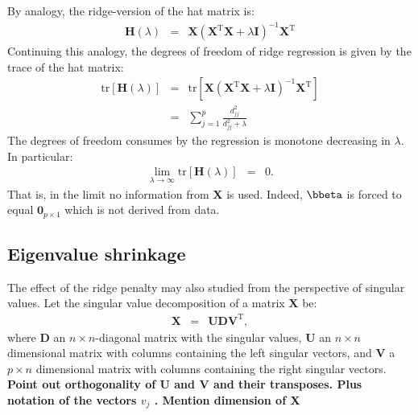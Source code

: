 \documentclass[a4paper]{article}
\theoremstyle{myexamplestyle}
\def\reminder#1{\marginpar{\rule[0pt]{1mm}{11pt}}\textbf{#1}}
\begin{document}
By analogy, the ridge-version of the hat matrix is:
\begin{eqnarray*}
\mathbf{H}(\lambda) & = & \mathbf{X} (\mathbf{X}^{\mathrm{T}} \mathbf{X} + \lambda \mathbf{I})^{-1} \mathbf{X}^{\mathrm{T}}
\end{eqnarray*}
Continuing this analogy, the degrees of freedom of ridge regression is given by the trace of the hat matrix:
\begin{eqnarray*}
\mbox{tr}[ \mathbf{H}(\lambda)] & = & \mbox{tr}[ \mathbf{X} (\mathbf{X}^{\mathrm{T}} \mathbf{X} + \lambda \mathbf{I})^{-1} \mathbf{X}^{\mathrm{T}} ]
\\
& = & \sum_{j=1}^p \frac{d_{jj}^2}{d_{jj}^2 + \lambda}
\end{eqnarray*}
The degrees of freedom consumes by the regression is monotone decreasing in $\lambda$. In particular:
\begin{eqnarray*}
\lim_{\lambda \rightarrow \infty} \mbox{tr}[ \mathbf{H}(\lambda)] & = & 0.
\end{eqnarray*}
That is, in the limit no information from $\mathbf{X}$ is used. Indeed, $\bbeta$ is forced to equal $\mathbf{0}_{p \times 1}$ which is not derived from data.





\subsection{Eigenvalue shrinkage}
The effect of the ridge penalty may also studied from the perspective of singular values. 
Let the singular value decomposition of a matrix $\mathbf{X}$ be:
\begin{eqnarray*}
\mathbf{X} & = & \mathbf{U} \mathbf{D} \mathbf{V}^{\mathrm{T}},
\end{eqnarray*}
where $\mathbf{D}$ an $n \times n$-diagonal matrix with the singular values,
$\mathbf{U}$ an $n \times n$ dimensional matrix with columns containing the left singular vectors, and $\mathbf{V}$ a $p \times n$ dimensional matrix with columns containing the right singular vectors. \reminder{Point out orthogonality of U and V and their transposes. Plus notation of the vectors $v_j$ . Mention dimension of X}
\end{document}
